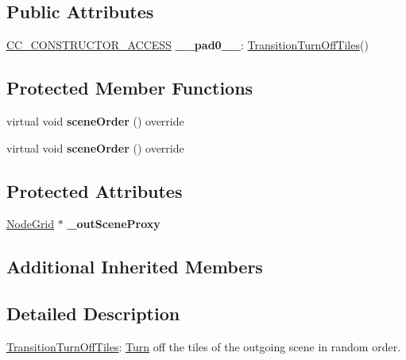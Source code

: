 \subsection*{Public Attributes}
\begin{DoxyCompactItemize}
\item 
\mbox{\label{classTransitionTurnOffTiles_a4ef640839f7b6c9f75d1f2ecf555e32c}} 
\hyperlink{_2cocos2d_2cocos_2base_2ccConfig_8h_a25ef1314f97c35a2ed3d029b0ead6da0}{C\+C\+\_\+\+C\+O\+N\+S\+T\+R\+U\+C\+T\+O\+R\+\_\+\+A\+C\+C\+E\+SS} {\bfseries \+\_\+\+\_\+pad0\+\_\+\+\_\+}\+: \hyperlink{classTransitionTurnOffTiles}{Transition\+Turn\+Off\+Tiles}()
\end{DoxyCompactItemize}
\subsection*{Protected Member Functions}
\begin{DoxyCompactItemize}
\item 
\mbox{\label{classTransitionTurnOffTiles_a7d306c3bcf91bfc5b77d8610b286b9b5}} 
virtual void {\bfseries scene\+Order} () override
\item 
\mbox{\label{classTransitionTurnOffTiles_aae8fc28c713860b32974ee5bb969d950}} 
virtual void {\bfseries scene\+Order} () override
\end{DoxyCompactItemize}
\subsection*{Protected Attributes}
\begin{DoxyCompactItemize}
\item 
\mbox{\label{classTransitionTurnOffTiles_a45bb7a8c0ec0d8cc97b9fb30e2347b4b}} 
\hyperlink{classNodeGrid}{Node\+Grid} $\ast$ {\bfseries \+\_\+out\+Scene\+Proxy}
\end{DoxyCompactItemize}
\subsection*{Additional Inherited Members}


\subsection{Detailed Description}
\hyperlink{classTransitionTurnOffTiles}{Transition\+Turn\+Off\+Tiles}\+: \hyperlink{classTurn}{Turn} off the tiles of the outgoing scene in random order. 

